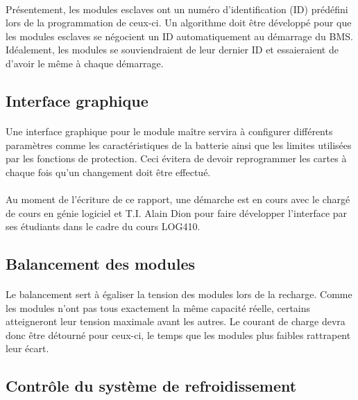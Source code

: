 		\paragraph{}
		Présentement, les modules esclaves ont un numéro d'identification (ID) prédéfini lors de la programmation de ceux-ci. Un algorithme doit être développé pour que les modules esclaves se négocient un ID automatiquement au démarrage du BMS. Idéalement, les modules se souviendraient de leur dernier ID et essaieraient de d'avoir le même à chaque démarrage.

	\subsection{Interface graphique}
		\paragraph{}
		Une interface graphique pour le module maître servira à configurer différents paramètres comme les caractéristiques de la batterie ainsi que les limites utilisées par les fonctions de protection. Ceci évitera de devoir reprogrammer les cartes à chaque fois qu'un changement doit être effectué.

		\paragraph{}
		Au moment de l'écriture de ce rapport, une démarche est en cours avec le chargé de cours en génie logiciel et T.I. Alain Dion pour faire développer l'interface par ses étudiants dans le cadre du cours LOG410.

	\subsection{Balancement des modules}

		\paragraph{}
		Le balancement sert à égaliser la tension des modules lors de la recharge. Comme les modules n'ont pas tous exactement la même capacité réelle, certains atteigneront leur tension maximale avant les autres. Le courant de charge devra donc être détourné pour ceux-ci, le temps que les modules plus faibles rattrapent leur écart.

	\subsection{Contrôle du système de refroidissement}

